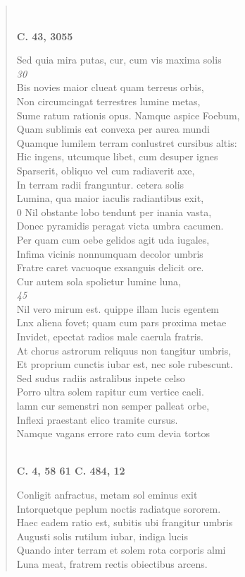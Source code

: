 \documentclass[11pt, a4paper]{report}
\begin{document}
\begin{verse}
        ﻿\pagebreak 
    \begin{center} \textbf{C. 43, 3055} \end{center}Sed quia mira putas, cur, cum vis maxima solis \\ \textit{30} \\ Bis novies maior clueat quam terreus orbis, \\ Non circumcingat terrestres lumine metas, \\ Sume ratum rationis opus. Namque aspice Foebum, \\ Quam sublimis eat convexa per aurea mundi \\ Quamque lumilem terram conlustret cursibus altis: \\ Hic ingens, utcumque libet, cum desuper ignes \\ Sparserit, obliquo vel cum radiaverit axe, \\ In terram radii franguntur. cetera solis \\ Lumina, qua maior iaculis radiantibus exit, \\ 0 Nil obstante lobo tendunt per inania vasta, \\ Donec pyramidis peragat victa umbra cacumen. \\ Per quam cum oebe gelidos agit uda iugales, \\ Infima vicinis nonnumquam decolor umbris \\ Fratre caret vacuoque exsanguis delicit ore. \\ Cur autem sola spolietur lumine luna, \\ \textit{45} \\ Nil vero mirum est. quippe illam lucis egentem \\ Lnx aliena fovet; quam cum pars proxima metae \\ Invidet, epectat radios male caerula fratris. \\ At chorus astrorum reliquus non tangitur umbris, \\ Et proprium cunctis iubar est, nec sole rubescunt. \\ Sed sudus radiis astralibus inpete celso \\ Porro ultra solem rapitur cum vertice caeli. \\ lamn cur semenstri non semper palleat orbe, \\ Inflexi praestant elico tramite cursus. \\ Namque vagans errore rato cum devia tortos \\ 
        ﻿\pagebreak 
    \begin{center} \textbf{C. 4, 58 61 C. 484, 12} \end{center}Conligit anfractus, metam sol eminus exit \\ Intorquetque peplum noctis radiatque sororem. \\ Haec eadem ratio est, subitis ubi frangitur umbris \\ Augusti solis rutilum iubar, indiga lucis \\ Quando inter terram et solem rota corporis almi \\ Luna meat, fratrem rectis obiectibus arcens. \\ 
      \end{verse}
  
\end{document}
